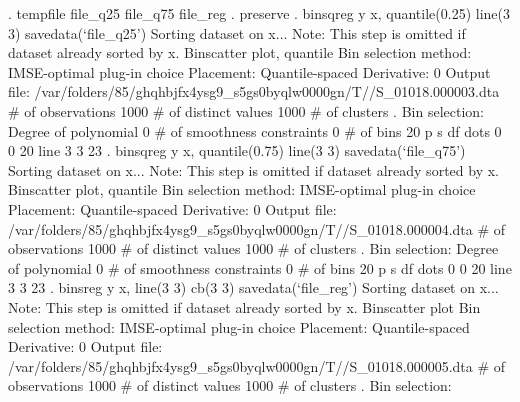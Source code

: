 . tempfile file_q25 file_q75 file_reg
{\smallskip}
. preserve
{\smallskip}
. binsqreg y x, quantile(0.25) line(3 3) savedata(`file_q25')
Sorting dataset on x...
Note: This step is omitted if dataset already sorted by x.
{\smallskip}
Binscatter plot, quantile
Bin selection method: IMSE-optimal plug-in choice
Placement: Quantile-spaced
Derivative: 0
Output file: /var/folders/85/ghqhbjfx4ysg9_s5gs0byqlw0000gn/T//S_01018.000003.dta
{\smallskip}
\# of observations             {\VBAR}    1000
\# of distinct values          {\VBAR}    1000
\# of clusters                 {\VBAR}       .
Bin selection:                {\VBAR} 
         Degree of polynomial {\VBAR}       0
  \# of smoothness constraints {\VBAR}       0
                    \# of bins {\VBAR}      20
{\smallskip}
         {\VBAR}      p       s       df
 dots    {\VBAR}      0       0       20
 line    {\VBAR}      3       3       23
{\smallskip}
. binsqreg y x, quantile(0.75) line(3 3) savedata(`file_q75')
Sorting dataset on x...
Note: This step is omitted if dataset already sorted by x.
{\smallskip}
Binscatter plot, quantile
Bin selection method: IMSE-optimal plug-in choice
Placement: Quantile-spaced
Derivative: 0
Output file: /var/folders/85/ghqhbjfx4ysg9_s5gs0byqlw0000gn/T//S_01018.000004.dta
{\smallskip}
\# of observations             {\VBAR}    1000
\# of distinct values          {\VBAR}    1000
\# of clusters                 {\VBAR}       .
Bin selection:                {\VBAR} 
         Degree of polynomial {\VBAR}       0
  \# of smoothness constraints {\VBAR}       0
                    \# of bins {\VBAR}      20
{\smallskip}
         {\VBAR}      p       s       df
 dots    {\VBAR}      0       0       20
 line    {\VBAR}      3       3       23
{\smallskip}
. binsreg y x, line(3 3) cb(3 3) savedata(`file_reg')
Sorting dataset on x...
Note: This step is omitted if dataset already sorted by x.
{\smallskip}
Binscatter plot
Bin selection method: IMSE-optimal plug-in choice
Placement: Quantile-spaced
Derivative: 0
Output file: /var/folders/85/ghqhbjfx4ysg9_s5gs0byqlw0000gn/T//S_01018.000005.dta
{\smallskip}
\# of observations             {\VBAR}    1000
\# of distinct values          {\VBAR}    1000
\# of clusters                 {\VBAR}       .
Bin selection:                {\VBAR} 
